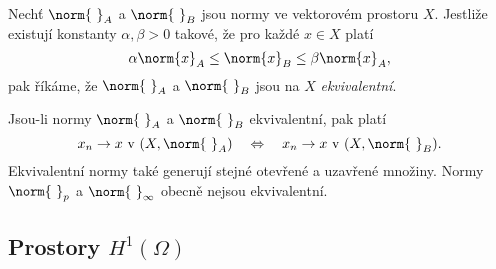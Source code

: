 \begin{df}
Nechť $\norm{\ }_A$ a $\norm{\ }_B$ jsou normy ve vektorovém prostoru $X$.
Jestliže existují konstanty $\alpha,\beta>0$ takové, že pro každé $x\in X$ platí
\[ \alpha\norm{x}_A \le \norm{x}_B \le \beta\norm{x}_A, \]
pak říkáme, že $\norm{\ }_A$ a $\norm{\ }_B$ jsou na $X$ \emph{ekvivalentní}.
\end{df}
% 
Jsou-li normy $\norm{\ }_A$ a $\norm{\ }_B$ ekvivalentní, pak platí
\[ x_n\to x \mbox{ v }(X,\norm{\ }_A) \quad \Leftrightarrow \quad x_n\to x \mbox{ v }(X,\norm{\ }_B). \]
Ekvivalentní normy také generují stejné otevřené a uzavřené množiny.
Normy $\norm{\ }_p$ a $\norm{\ }_\infty$ obecně nejsou ekvivalentní.



















\subsection{Prostory $H^1(\Omega)$}

